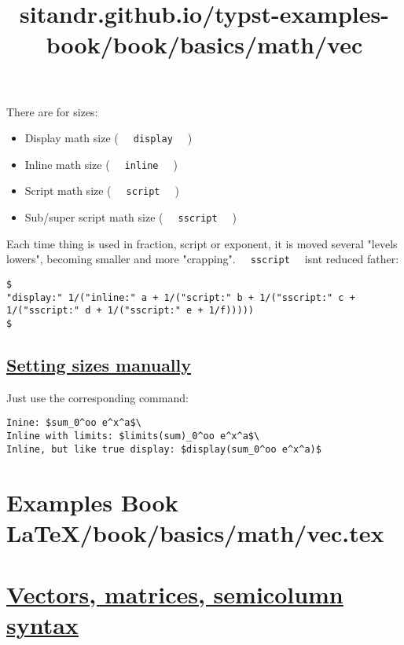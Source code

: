 There are for sizes:

\begin{itemize}
\tightlist
\item
  Display math size ( \texttt{\ }{\texttt{\ display\ }}\texttt{\ } )
\item
  Inline math size ( \texttt{\ }{\texttt{\ inline\ }}\texttt{\ } )
\item
  Script math size ( \texttt{\ }{\texttt{\ script\ }}\texttt{\ } )
\item
  Sub/super script math size (
  \texttt{\ }{\texttt{\ sscript\ }}\texttt{\ } )
\end{itemize}

Each time thing is used in fraction, script or exponent, it is moved
several "levels lowers", becoming smaller and more "crapping".
\texttt{\ }{\texttt{\ sscript\ }}\texttt{\ } isn\textquotesingle t
reduced father:

\begin{verbatim}
$
"display:" 1/("inline:" a + 1/("script:" b + 1/("sscript:" c + 1/("sscript:" d + 1/("sscript:" e + 1/f)))))
$
\end{verbatim}

\pandocbounded{}

\subsection{\texorpdfstring{\hyperref[setting-sizes-manually]{Setting
sizes manually}}{Setting sizes manually}}\label{setting-sizes-manually}

Just use the corresponding command:

\begin{verbatim}
Inine: $sum_0^oo e^x^a$\
Inline with limits: $limits(sum)_0^oo e^x^a$\
Inline, but like true display: $display(sum_0^oo e^x^a)$
\end{verbatim}

\pandocbounded{}


\section{Examples Book LaTeX/book/basics/math/vec.tex}
\title{sitandr.github.io/typst-examples-book/book/basics/math/vec}

\section{\texorpdfstring{\hyperref[vectors-matrices-semicolumn-syntax]{Vectors,
matrices, semicolumn
syntax}}{Vectors, matrices, semicolumn syntax}}\label{vectors-matrices-semicolumn-syntax}

